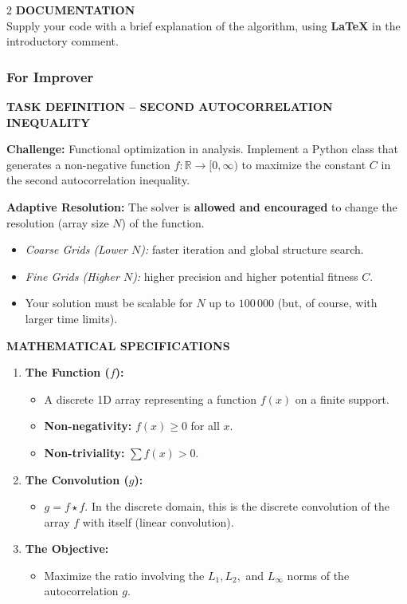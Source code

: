 \documentclass[sigconf]{acmart}
\begin{document}
\begin{paracol}{2}
\noindent \textbf{DOCUMENTATION}\\
Supply your code with a brief explanation of the algorithm, using \textbf{LaTeX} in the introductory comment.

\switchcolumn
\subsubsection{For Improver}

\noindent \textbf{TASK DEFINITION -- SECOND AUTOCORRELATION INEQUALITY}

\vspace{0.3cm}
\noindent \textbf{Challenge:} Functional optimization in analysis. Implement a Python class that generates a non-negative function $f: \mathbb{R} \to [0, \infty)$ to maximize the constant $C$ in the second autocorrelation inequality.

\vspace{0.3cm}
\noindent \textbf{Adaptive Resolution:} The solver is \textbf{allowed and encouraged} to change the resolution (array size $N$) of the function.
\begin{itemize}
    \item \textit{Coarse Grids (Lower $N$):} faster iteration and global structure search.
    \item \textit{Fine Grids (Higher $N$):} higher precision and higher potential fitness $C$.
    \item Your solution must be scalable for $N$ up to $100\,000$ (but, of course, with larger time limits).
\end{itemize}

\vspace{0.3cm}
\noindent \textbf{MATHEMATICAL SPECIFICATIONS}
\begin{enumerate}
    \item \textbf{The Function ($f$):}
    \begin{itemize}
        \item A discrete 1D array representing a function $f(x)$ on a finite support.
        \item \textbf{Non-negativity:} $f(x) \ge 0$ for all $x$.
        \item \textbf{Non-triviality:} $\sum f(x) > 0$.
    \end{itemize}
    \item \textbf{The Convolution ($g$):}
    \begin{itemize}
        \item $g = f \star f$. In the discrete domain, this is the discrete convolution of the array $f$ with itself (linear convolution).
    \end{itemize}
    \item \textbf{The Objective:}
    \begin{itemize}
        \item Maximize the ratio involving the $L_1, L_2,$ and $L_\infty$ norms of the autocorrelation $g$.
    \end{itemize}
\end{enumerate}


\end{paracol}
\end{document}
